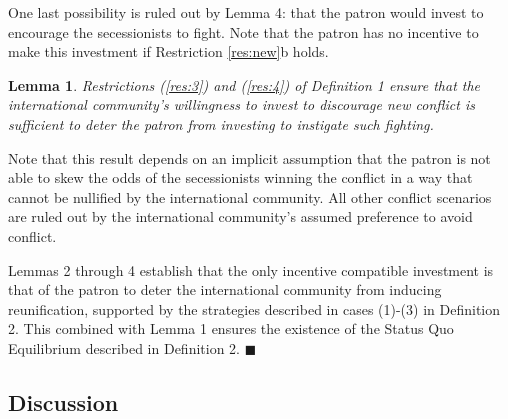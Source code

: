 \documentclass[11pt,letterpaper, notitlepage]{article}
\newtheorem{lemma}{Lemma}
\begin{document}
One last possibility is ruled out by Lemma 4: that the patron would invest to encourage the secessionists to fight. Note that the patron has no incentive to make this investment if Restriction \ref{res:new}b holds.

\begin{lemma}
Restrictions (\ref{res:3}) and (\ref{res:4}) of Definition 1 ensure that the international community's willingness to invest to discourage new conflict is sufficient to deter the patron from investing to instigate such fighting.
\end{lemma}

Note that this result depends on an implicit assumption that the patron is not able to skew the odds of the secessionists winning the conflict in a way that cannot be nullified by the international community. All other conflict scenarios are ruled out by the international community's assumed preference to avoid conflict.


Lemmas 2 through 4 establish that the only incentive compatible investment is that of the patron to deter the international community from inducing reunification, supported by the strategies described in cases (1)-(3) in Definition 2. This combined with Lemma 1 ensures the existence of the Status Quo Equilibrium described in Definition 2. \hfill $\blacksquare$

\subsection{Discussion}
\end{document}
